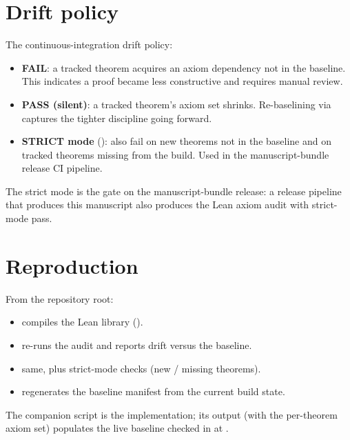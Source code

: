 \section{Drift policy}
\label{sec:audit-drift}

The continuous-integration drift policy:

\begin{itemize}
  \item \textbf{FAIL}: a tracked theorem acquires an axiom
    dependency not in the baseline.  This indicates a proof became
    less constructive and requires manual review.
  \item \textbf{PASS (silent)}: a tracked theorem's axiom set
    shrinks.  Re-baselining via
     captures the tighter discipline
    going forward.
  \item \textbf{STRICT mode}
    (): also fail on new theorems
    not in the baseline and on tracked theorems missing from the
    build.  Used in the manuscript-bundle release CI pipeline.
\end{itemize}

The strict mode is the gate on the manuscript-bundle release: a
release pipeline that produces this manuscript also produces the
Lean axiom audit with strict-mode pass.

\section{Reproduction}
\label{sec:audit-reproduce}

From the repository root:
\begin{itemize}
  \item {} compiles the Lean library
    ().
  \item {} re-runs the audit and reports
    drift versus the baseline.
  \item {} same, plus strict-mode
    checks (new / missing theorems).
  \item {} regenerates the baseline
    manifest from the current build state.
\end{itemize}

The companion script
 is the implementation;
its output (with the per-theorem axiom set) populates the
live baseline checked in at .
